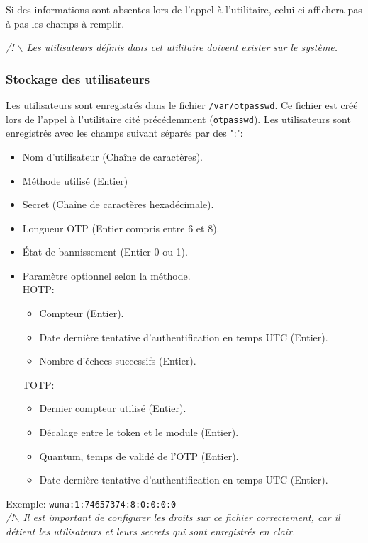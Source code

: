 \documentclass{"../../../res/univ-projet"}
\begin{document}
Si des informations sont absentes lors de l'appel à l'utilitaire, 
celui-ci affichera pas à pas les champs à remplir.

\textit{/! $\backslash$ Les utilisateurs définis dans cet utilitaire 
doivent exister sur le système.}

\subsubsection{Stockage des utilisateurs}
Les utilisateurs sont enregistrés dans le fichier \verb?/var/otpasswd?.
Ce fichier est créé lors de l'appel à l'utilitaire cité précédemment (\verb?otpasswd?).
Les utilisateurs sont enregistrés avec les champs suivant séparés par des ":":
\begin{itemize}
\item Nom d'utilisateur (Chaîne de caractères).
\item Méthode utilisé (Entier)
\item Secret (Chaîne de caractères hexadécimale).
\item Longueur OTP (Entier compris entre 6 et 8).
\item \'{E}tat de bannissement (Entier 0 ou 1).
\item Paramètre optionnel selon la méthode.\\
HOTP:
\begin{itemize}
\item Compteur (Entier).
\item Date dernière tentative d'authentification en temps UTC (Entier).
\item Nombre d'échecs successifs (Entier).
\end{itemize}
TOTP:
\begin{itemize}
\item Dernier compteur utilisé (Entier).
\item Décalage entre le token et le module (Entier).
\item Quantum, temps de validé de l'OTP (Entier).
\item Date dernière tentative d'authentification en temps UTC (Entier).
\end{itemize}
\end{itemize}

Exemple: \verb?wuna:1:74657374:8:0:0:0:0?\\

\textit{/!$\backslash$ Il est important de configurer les droits sur ce fichier correctement, car il détient les utilisateurs et
leurs secrets qui sont enregistrés en clair.}
\end{document}
